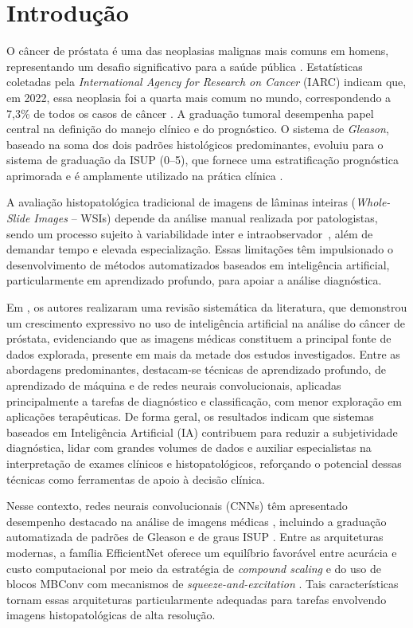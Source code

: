 \chapter{Introdução}
\label{cap:introducao}

O câncer de próstata é uma das neoplasias malignas mais comuns em homens, representando um desafio significativo para a saúde pública \cite{ref_siegel2024}. Estatísticas coletadas pela \textit{International Agency for Research on Cancer} (IARC) indicam que, em 2022, essa neoplasia foi a quarta mais comum no mundo, correspondendo a 7,3\% de todos os casos de câncer \cite{JournalStatistic2024}. A graduação tumoral desempenha papel central na definição do manejo clínico e do prognóstico. O sistema de \textit{Gleason}, baseado na soma dos dois padrões histológicos predominantes, evoluiu para o sistema de graduação da ISUP (0–5), que fornece uma estratificação prognóstica aprimorada e é amplamente utilizado na prática clínica \cite{ref-epstein2016}.

A avaliação histopatológica tradicional de imagens de lâminas inteiras (\textit{Whole-Slide Images} – WSIs) depende da análise manual realizada por patologistas, sendo um processo sujeito à variabilidade inter e intraobservador~\cite{ref-bulten2020}, além de demandar tempo e elevada especialização. Essas limitações têm impulsionado o desenvolvimento de métodos automatizados baseados em inteligência artificial, particularmente em aprendizado profundo, para apoiar a análise diagnóstica.

Em \cite{expert2022review}, os autores realizaram uma revisão sistemática da literatura, que demonstrou um crescimento expressivo no uso de inteligência artificial na análise do câncer de próstata, evidenciando que as imagens médicas constituem a principal fonte de dados explorada, presente em mais da metade dos estudos investigados. Entre as abordagens predominantes, destacam-se técnicas de aprendizado profundo, de aprendizado de máquina e de redes neurais convolucionais, aplicadas principalmente a tarefas de diagnóstico e classificação, com menor exploração em aplicações terapêuticas. De forma geral, os resultados indicam que sistemas baseados em Inteligência Artificial (IA) contribuem para reduzir a subjetividade diagnóstica, lidar com grandes volumes de dados e auxiliar especialistas na interpretação de exames clínicos e histopatológicos, reforçando o potencial dessas técnicas como ferramentas de apoio à decisão clínica.

Nesse contexto, redes neurais convolucionais (CNNs) têm apresentado desempenho destacado na análise de imagens médicas \cite{ref-campanella2019}, incluindo a graduação automatizada de padrões de Gleason e de graus ISUP \cite{ref-nagpal2019,ref-bulten2020}. Entre as arquiteturas modernas, a família EfficientNet \cite{ref-tan2019} oferece um equilíbrio favorável entre acurácia e custo computacional por meio da estratégia de \textit{compound scaling} e do uso de blocos MBConv com mecanismos de \textit{squeeze-and-excitation} \cite{ref-hu2018}. Tais características tornam essas arquiteturas particularmente adequadas para tarefas envolvendo imagens histopatológicas de alta resolução.

